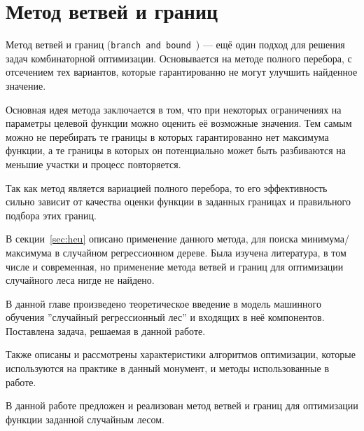 \section{Метод ветвей и границ}\label{sec:branch_bound}

Метод ветвей и границ (\texttt{branch and bound}~\cite{branch}) --- ещё один
подход для решения задач комбинаторной оптимизации. Основывается на методе
полного перебора, с отсечением тех вариантов, которые гарантированно не могут
улучшить найденное значение.

Основная идея метода заключается в том, что при некоторых ограничениях на
параметры целевой функции можно оценить её возможные значения. Тем самым можно
не перебирать те границы в которых гарантированно нет максимума функции, а те
границы в которых он потенциально может быть разбиваются на меньшие участки
и процесс повторяется.

Так как метод является вариацией полного перебора, то его эффективность сильно
зависит от качества оценки функции в заданных границах и правильного подбора
этих границ.

В секции~\ref{sec:heu} описано применение данного метода, для поиска
минимума/максимума в случайном регрессионном дереве. Была изучена литература,
в том числе и современная, но применение метода ветвей и границ для оптимизации
случайного леса нигде не найдено.

\chapterconclusion

В данной главе произведено теоретическое введение в модель машинного обучения
''случайный регрессионный лес'' и входящих в неё компонентов. Поставлена задача,
решаемая в данной работе. 

Также описаны и рассмотрены характеристики алгоритмов оптимизации, которые
используются на практике в данный монумент, и методы использованные в работе.

В данной работе предложен и реализован метод ветвей и границ для оптимизации
функции заданной случайным лесом.
